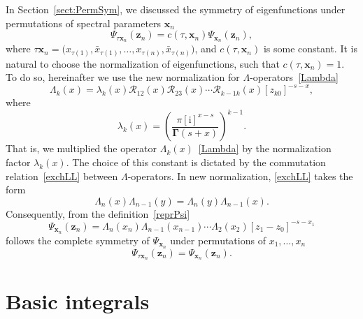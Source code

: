 \documentclass[10pt,a4paper]{amsart}
\renewcommand{\imath}{\mathrm{i}}
\numberwithin{equation}{section}
\begin{document}
In Section~\ref{sect:PermSym}, we discussed the symmetry of eigenfunctions under permutations of spectral parameters $\bm x_n$
\begin{equation*}
	\Psi_{\tau \bm x_n}(\bm z_n) =
	c(\tau,\bm x_n) \Psi_{\bm x_n}(\bm z_n) ,
\end{equation*}
where $\tau \bm x_n = \bigl(x_{\tau(1)},\bar{x}_{\tau(1)}, \dots , x_{\tau(n)},\bar{x}_{\tau(n)}\bigr)$, and $c(\tau,\bm x_n)$ is some constant. It is natural to choose the normalization of eigenfunctions, such that $c(\tau,\bm x_n)=1$.
To do so, hereinafter we use the new normalization for $\Lambda$-operators~\eqref{Lambda}
\begin{equation*}
	\Lambda_k(x) = \lambda_k(x) \mathcal{R}_{12}(x)\mathcal{R}_{23}(x)\cdots
	\mathcal{R}_{k-1 k}(x) [z_{k0}]^{-s-x} ,
\end{equation*}
where
\begin{equation} \label{lambda}
	\lambda_k(x) =
	\left(\frac{\pi [\imath]^{x-s}}{\mathbf{\Gamma}(s+x)}\right)^{k-1} .
\end{equation}
That is, we multiplied the operator $\Lambda_k(x)$~\eqref{Lambda} by the normalization factor $\lambda_k(x)$. The choice of this constant is dictated by the commutation relation~\eqref{exchLL} between $\Lambda$-operators. In new normalization, \eqref{exchLL} takes the form
\begin{equation*}
	\Lambda_n(x) \Lambda_{n-1}(y) =
	\Lambda_n(y) \Lambda_{n-1}(x) .
\end{equation*}
Consequently, from the definition~\eqref{reprPsi}
\begin{equation*}
	\Psi_{\bm{x}_n}(\bm z_n) =
	\Lambda_n( x_n)
	\Lambda_{n-1}( x_{n-1})\cdots
	\Lambda_{2}( x_{2}) [z_1-z_0]^{-s-x_1}
\end{equation*}
follows the complete symmetry of $\Psi_{\bm{x}_n}$ under permutations of $x_1, \dots, x_n$
\begin{equation*}
	\Psi_{\tau \bm x_n}(\bm z_n) =
	\Psi_{\bm x_n}(\bm z_n) .
\end{equation*}

\section{Basic integrals}
\label{sect:Basic}
\end{document}
